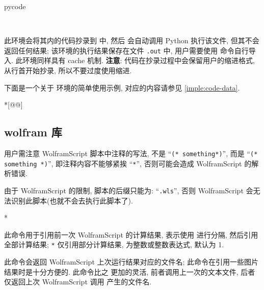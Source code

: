 \documentclass[
  hyper, lang=cn, 
  class=l3dox, 
]{../../zlatex/code/ztex}
\begin{document}
\begin{function}[added=2025-05-15]{pycode}
  \begin{syntax}
  ~~~~ 
  \end{syntax}
  此环境会将其内的代码抄录到  中, 然后 \ztikz{} 会自动调用 Python 执行该文件, 但其不会返回任何结果;
  该环境的执行结果保存在文件 \texttt{.out} 中, 用户需要使用  命令自行导入. 此环境同样具有
  cache 机制. \textbf{注意}: 代码在抄录过程中会保留用户的缩进格式, 从行首开始抄录, 所以不要过度使用缩进.
\end{function}
下面是一个关于  环境的简单使用示例,  对应的内容请参见 \cref{imple:code-data}.
\begin{DocExample}*[@@]

\end{DocExample}



\clearpage
\subsection{wolfram 库}
用户需注意 WolframScript 脚本中注释的写法, 不是 ``\verb|(* something*)|'', 而是 ``\verb|(* something *)|'',
即注释内容不能够紧挨 ``\verb|*|'', 否则可能会造成 WolframScript 的解析错误.

由于 WolframScript 的限制, 脚本的后缀只能为: ``\texttt{.wls}'', 否则 WolframScript
会无法识别此脚本(也就不会去执行此脚本了). 

\begin{function}[added=2025-05-15]{\wolframResult}
  \begin{syntax}
    *
  \end{syntax}
  此命令用于引用前一次 WolframScript 的计算结果, \texttt{} 
  表示使用  进行分隔, 然后引用全部计算结果; \texttt{*}
  仅引用部分计算结果,  为整数或整数表达式, 默认为 1.
\end{function}


\begin{function}[added=2025-05-15]{\wolframOuputFile}
  此命令会返回 WolframScript 上次运行结果对应的文件名; 此命令在引用一些图片结果时是十分方便的.
  此命令比之  更加的灵活, 前者调用上一次的文本文件, 后者仅返回上次 WolframScript 调用
  产生的文件名.
\end{function}
\end{document}
